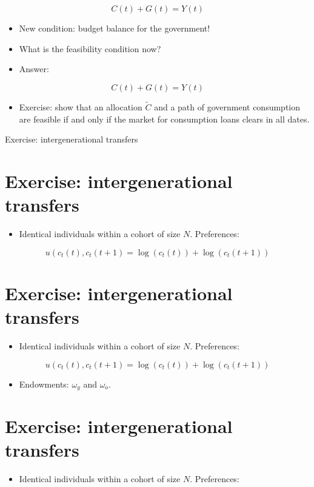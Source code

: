 \documentclass[10pt]{article}
\begin{document}
$$
C(t)+G(t)=Y(t)
$$

\begin{itemize}
  \item New condition: budget balance for the government!
  \item What is the feasibility condition now?
  \item Answer:
\end{itemize}

$$
C(t)+G(t)=Y(t)
$$

\begin{itemize}
  \item Exercise: show that an allocation $\widetilde{C}$ and a path of government consumption are feasible if and only if the market for consumption loans clears in all dates.
\end{itemize}

Exercise: intergenerational transfers

\section*{Exercise: intergenerational transfers}
\begin{itemize}
  \item Identical individuals within a cohort of size $N$. Preferences:
\end{itemize}

$$
u\left(c_{t}(t), c_{t}(t+1)=\log \left(c_{t}(t)\right)+\log \left(c_{t}(t+1)\right)\right.
$$

\section*{Exercise: intergenerational transfers}
\begin{itemize}
  \item Identical individuals within a cohort of size $N$. Preferences:
\end{itemize}

$$
u\left(c_{t}(t), c_{t}(t+1)=\log \left(c_{t}(t)\right)+\log \left(c_{t}(t+1)\right)\right.
$$

\begin{itemize}
  \item Endowments: $\omega_{y}$ and $\omega_{o}$.
\end{itemize}

\section*{Exercise: intergenerational transfers}
\begin{itemize}
  \item Identical individuals within a cohort of size $N$. Preferences:
\end{itemize}
\end{document}
